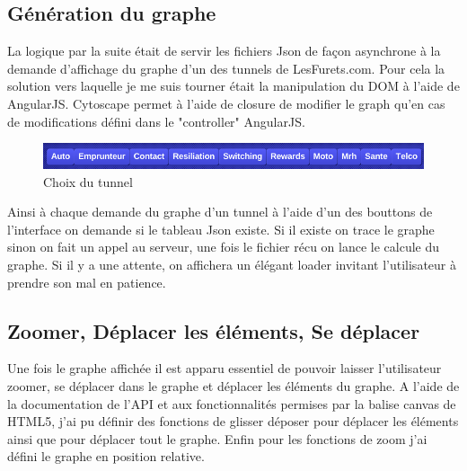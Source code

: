 \subsection{Génération du graphe}
La logique par la suite était de servir les fichiers Json de façon asynchrone à la demande d'affichage du graphe d'un des tunnels de LesFurets.com. Pour cela la solution vers laquelle je me suis tourner était la manipulation du DOM à l'aide de AngularJS. Cytoscape permet à l'aide de closure de modifier le graph qu'en cas de modifications défini dans le "controller" AngularJS. 
\vspace{0.2in}
\begin{figure}[!ht]
\center
\includegraphics[width=15cm]{outil/buttons-tunnels.png}
\caption{Choix du tunnel}
\end{figure}
Ainsi à chaque demande du graphe d'un tunnel à l'aide d'un des bouttons de l'interface on demande si le tableau Json existe. Si il existe on trace le graphe sinon on fait un appel au serveur, une fois le fichier récu on lance le calcule du graphe. Si il y a une attente, on affichera un élégant loader invitant l'utilisateur à prendre son mal en patience.

\subsection{Zoomer, Déplacer les éléments, Se déplacer}
Une fois le graphe affichée il est apparu essentiel de pouvoir laisser l’utilisateur zoomer, se déplacer dans le graphe et déplacer les éléments du graphe. A l'aide de la documentation de l'API et aux fonctionnalités permises par la balise canvas de HTML5, j'ai pu définir des fonctions de glisser déposer pour déplacer les éléments ainsi que pour déplacer tout le graphe. Enfin pour les fonctions de zoom j'ai défini le graphe en position relative.
\clearpage
